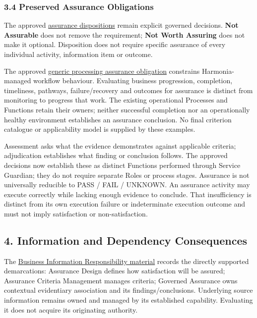 \subsubsection*{3.4 Preserved Assurance Obligations}
\label{rad:assurance:124}

The approved \hyperref[rad:enabling:701]{assurance dispositions} remain explicit governed decisions. \textbf{Not Assurable} does not remove the requirement; \textbf{Not Worth Assuring} does not make it optional. Disposition does not require specific assurance of every individual activity, information item or outcome.

\label{rad:assurance:126}

The approved \hyperref[rad:enabling:716]{generic processing assurance obligation} constrains Harmonia-managed workflow behaviour. Evaluating business progression, completion, timeliness, pathways, failure/\allowbreak{}recovery and outcomes for assurance is distinct from monitoring to progress that work. The existing operational Processes and Functions retain their owners; neither successful completion nor an operationally healthy environment establishes an assurance conclusion. No final criterion catalogue or applicability model is supplied by these examples.

\label{rad:assurance:128}

Assessment asks what the evidence demonstrates against applicable criteria; adjudication establishes what finding or conclusion follows. The approved decisions now establish these as distinct Functions performed through Service Guardian; they do not require separate Roles or process stages. Assurance is not universally reducible to PASS /\allowbreak{} FAIL /\allowbreak{} UNKNOWN. An assurance activity may execute correctly while lacking enough evidence to conclude. That insufficiency is distinct from its own execution failure or indeterminate execution outcome and must not imply satisfaction or non-satisfaction.

\label{rad:assurance:130}
\subsection*{4. Information and Dependency Consequences}
\label{rad:assurance:132}

The \href{https://github.com/fhirfactory/harmonia/blob/98410db60155198a75f74c79d98060070209faa1/docs/markdown/03-business-architecture/information-responsibility/information-responsibility.md\#4-assurance-related-business-information-responsibilities}{Business Information Responsibility material} records the directly supported demarcations: Assurance Design defines how satisfaction will be assured; Assurance Criteria Management manages criteria; Governed Assurance owns contextual evidentiary association and its findings/\allowbreak{}conclusions. Underlying source information remains owned and managed by its established capability. Evaluating it does not acquire its originating authority.

